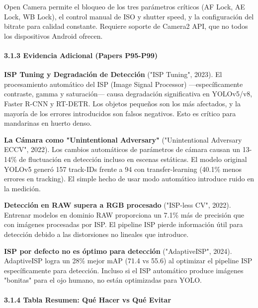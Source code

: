 Open Camera permite el bloqueo de los tres parámetros críticos (AF Lock, AE Lock, WB Lock), el control manual de ISO y shutter speed, y la configuración del bitrate para calidad constante. Requiere soporte de Camera2 API, que no todos los dispositivos Android ofrecen.


\paragraph{3.1.3 Evidencia Adicional (Papers P95-P99)}


\textbf{ISP Tuning y Degradación de Detección} ("ISP Tuning", 2023). El procesamiento automático del ISP (Image Signal Processor) —específicamente contraste, gamma y saturación— causa degradación significativa en YOLOv5/v8, Faster R-CNN y RT-DETR. Los objetos pequeños son los más afectados, y la mayoría de los errores introducidos son falsos negativos. Esto es crítico para mandarinas en huerto denso.


\textbf{La Cámara como "Unintentional Adversary"} ("Unintentional Adversary ECCV", 2022). Los cambios automáticos de parámetros de cámara causan un 13-14\% de fluctuación en detección incluso en escenas estáticas. El modelo original YOLOv5 generó 157 track-IDs frente a 94 con transfer-learning (40.1\% menos errores en tracking). El simple hecho de usar modo automático introduce ruido en la medición.


\textbf{Detección en RAW supera a RGB procesado} ("ISP-less CV", 2022). Entrenar modelos en dominio RAW proporciona un 7.1\% más de precisión que con imágenes procesadas por ISP. El pipeline ISP pierde información útil para detección debido a las distorsiones no lineales que introduce.


\textbf{ISP por defecto no es óptimo para detección} ("AdaptiveISP", 2024). AdaptiveISP logra un 28\% mejor mAP (71.4 vs 55.6) al optimizar el pipeline ISP específicamente para detección. Incluso si el ISP automático produce imágenes "bonitas" para el ojo humano, no están optimizadas para YOLO.


\paragraph{3.1.4 Tabla Resumen: Qué Hacer vs Qué Evitar}



